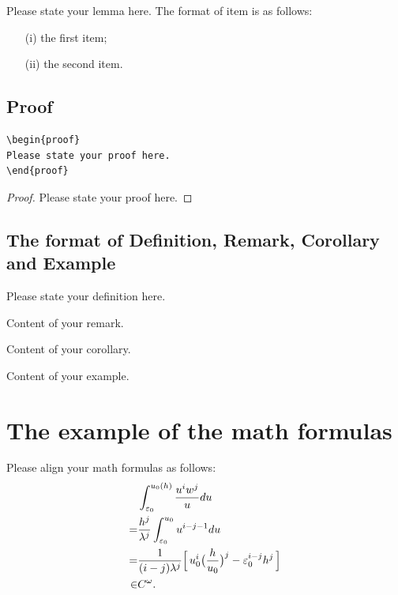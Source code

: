 \documentclass{uestcMath}
\begin{document}
 \begin{lemma}
 \label{le1}
  Please state your lemma here. The format of item is as follows:
\begin{itemize}
\item[(i)] the first item;
\item[(ii)] the second item.
\end{itemize}
\end{lemma}

 \subsection{Proof}

\begin{verbatim}
\begin{proof}
Please state your proof here.
\end{proof}
 \end{verbatim}


\begin{proof}
Please state your proof here.
\end{proof}


\subsection{The format of Definition, Remark,  Corollary and Example}
\begin{definition}\label{de1} Please state your definition here.\end{definition}

\begin{remark}\label{re1} Content of your remark.\end{remark}

\begin{corollary}\label{co1}Content of your corollary.\end{corollary}

\begin{example}\label{ex1}Content of your example.\end{example}





\section{The example of the math formulas}
Please align your math formulas as follows:
\begin{align*}
&\int_{\varepsilon_{0}}^{u_{0}(h)}\frac{u^{i}w^{j}}{u}du\\
=&\frac{h^{j}}{\lambda^{j}}\int_{\varepsilon_{0}}^{u_{0}}u^{i-j-1}du\vspace{.2cm}\\
=&\frac{1}{(i-j)\lambda^{j}}\Big[\,u_{0}^{i}\big(\frac{h}{u_{0}}\big)^{j}-\varepsilon_{0}^{i-j}h^{j}\,\Big] \vspace{.2cm}\\
\in& C^{\omega}.
\end{align*}
\end{document}
